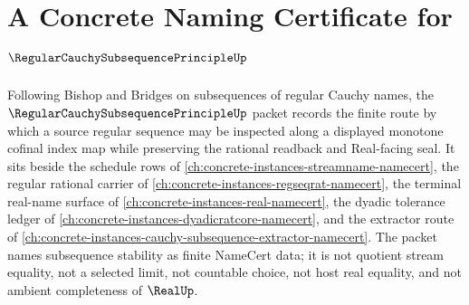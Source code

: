 \chapter{A Concrete Naming Certificate for $\RegularCauchySubsequencePrincipleUp$}
\label{ch:concrete-instances-regular-cauchy-subsequence-principle-namecert}

Following Bishop and Bridges on subsequences of regular Cauchy names, the $\RegularCauchySubsequencePrincipleUp$ packet records the finite route by which a source regular sequence may be inspected along a displayed monotone cofinal index map while preserving the rational readback and Real-facing seal. It sits beside the schedule rows of \autoref{ch:concrete-instances-streamname-namecert}, the regular rational carrier of \autoref{ch:concrete-instances-regseqrat-namecert}, the terminal real-name surface of \autoref{ch:concrete-instances-real-namecert}, the dyadic tolerance ledger of \autoref{ch:concrete-instances-dyadicratcore-namecert}, and the extractor route of \autoref{ch:concrete-instances-cauchy-subsequence-extractor-namecert}. The packet names subsequence stability as finite NameCert data; it is not quotient stream equality, not a selected limit, not countable choice, not host real equality, and not ambient completeness of $\RealUp$.

